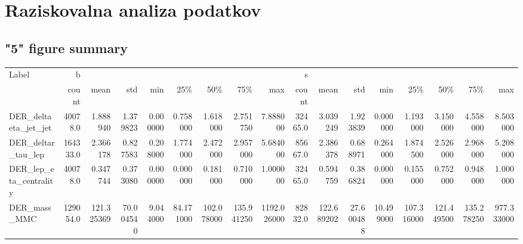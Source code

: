 \appendix
{}
\chapter{Raziskovalna analiza podatkov}



\section{"5" figure summary}

\begin{table}[ht]
	\centering
	\begin{tabular}{lrrrrrrrrrrrrrrrr}
		\hline
		Label &         b &                &               &                &                &                &                &                &        s &                &               &                &                &                &                &                \\
		{} &     count &           mean &           std &            min &            25\% &            50\% &            75\% &            max &    count &           mean &           std &            min &            25\% &            50\% &            75\% &            max \\
		\hline
		DER\_deltaeta\_jet\_jet        &   40078.0 &       1.888940 &      1.379823 &       0.000000 &       0.758000 &       1.618000 &       2.751750 &       7.888000 &  32465.0 &       3.039249 &      1.923839 &       0.000000 &       1.193000 &       3.150000 &       4.558000 &       8.503000 \\
		DER\_deltar\_tau\_lep          &  164333.0 &       2.366178 &      0.827583 &       0.208000 &       1.774000 &       2.472000 &       2.957000 &       5.684000 &  85667.0 &       2.386378 &      0.688971 &       0.264000 &       1.874500 &       2.526000 &       2.968000 &       5.208000 \\
		DER\_lep\_eta\_centrality      &   40078.0 &       0.347744 &      0.373080 &       0.000000 &       0.000000 &       0.181000 &       0.710000 &       1.000000 &  32465.0 &       0.594759 &      0.386824 &       0.000000 &       0.155000 &       0.752000 &       0.948000 &       1.000000 \\
		DER\_mass\_MMC                &  129054.0 &     121.325369 &     70.004540 &       9.044000 &      84.171000 &     102.078000 &     135.941250 &    1192.026000 &  82832.0 &     122.689202 &     27.600488 &      10.499000 &     107.316000 &     121.449500 &     135.278250 &     977.333000 \\

\end{tabular}
\end{table}

